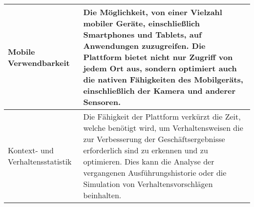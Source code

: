 \begin{longtable}{P{4cm}|X}
  Mobile Verwendbarkeit & Die Möglichkeit, von einer Vielzahl mobiler Geräte, einschließlich Smartphones und Tablets, auf Anwendungen zuzugreifen. Die Plattform bietet nicht nur Zugriff von jedem Ort aus, sondern optimiert auch die nativen Fähigkeiten des Mobilgeräts, einschließlich der Kamera und anderer Sensoren.\\ \hline
  Kontext- und Verhaltensstatistik & Die Fähigkeit der Plattform verkürzt die Zeit, welche benötigt wird, um Verhaltensweisen die zur Verbesserung der Geschäftsergebnisse erforderlich sind zu erkennen und zu optimieren. Dies kann die Analyse der vergangenen Ausführungshistorie oder die Simulation von Verhaltensvorschlägen beinhalten.\\
 \end{longtable}
